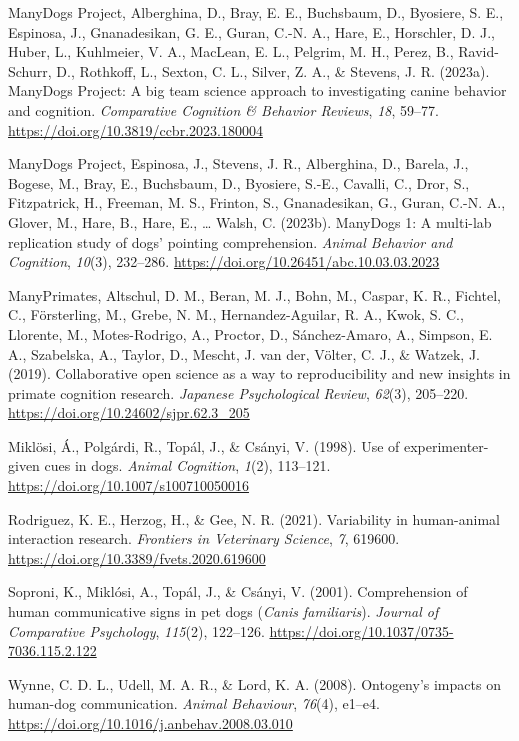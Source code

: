 \documentclass[
  man,floatsintext]{apa6}
\newlength{\cslhangindent}
\newlength{\cslentryspacingunit} %
\newenvironment{CSLReferences}[2] %
 {%
  \setlength{\parindent}{0pt}
  \ifodd #1
  \let\oldpar\par
  \def\par{\hangindent=\cslhangindent\oldpar}
  \fi
  \setlength{\parskip}{#2\cslentryspacingunit}
 }%
 {}
\begin{document}
\begin{CSLReferences}{1}{0}
\leavevmode{}%
ManyDogs Project, Alberghina, D., Bray, E. E., Buchsbaum, D., Byosiere, S. E., Espinosa, J., Gnanadesikan, G. E., Guran, C.-N. A., Hare, E., Horschler, D. J., Huber, L., Kuhlmeier, V. A., MacLean, E. L., Pelgrim, M. H., Perez, B., Ravid-Schurr, D., Rothkoff, L., Sexton, C. L., Silver, Z. A., \& Stevens, J. R. (2023a). {ManyDogs Project}: {A} big team science approach to investigating canine behavior and cognition. \emph{Comparative Cognition \& Behavior Reviews}, \emph{18}, 59--77. \url{https://doi.org/10.3819/ccbr.2023.180004}

\leavevmode{}%
ManyDogs Project, Espinosa, J., Stevens, J. R., Alberghina, D., Barela, J., Bogese, M., Bray, E., Buchsbaum, D., Byosiere, S.-E., Cavalli, C., Dror, S., Fitzpatrick, H., Freeman, M. S., Frinton, S., Gnanadesikan, G., Guran, C.-N. A., Glover, M., Hare, B., Hare, E., \ldots{} Walsh, C. (2023b). {ManyDogs} 1: {A} multi-lab replication study of dogs' pointing comprehension. \emph{Animal Behavior and Cognition}, \emph{10}(3), 232--286. \url{https://doi.org/10.26451/abc.10.03.03.2023}

\leavevmode{}%
ManyPrimates, Altschul, D. M., Beran, M. J., Bohn, M., Caspar, K. R., Fichtel, C., Försterling, M., Grebe, N. M., Hernandez-Aguilar, R. A., Kwok, S. C., Llorente, M., Motes-Rodrigo, A., Proctor, D., Sánchez-Amaro, A., Simpson, E. A., Szabelska, A., Taylor, D., Mescht, J. van der, Völter, C. J., \& Watzek, J. (2019). Collaborative open science as a way to reproducibility and new insights in primate cognition research. \emph{Japanese Psychological Review}, \emph{62}(3), 205--220. \url{https://doi.org/10.24602/sjpr.62.3_205}

\leavevmode{}%
Miklösi, Á., Polgárdi, R., Topál, J., \& Csányi, V. (1998). Use of experimenter-given cues in dogs. \emph{Animal Cognition}, \emph{1}(2), 113--121. \url{https://doi.org/10.1007/s100710050016}

\leavevmode{}%
Rodriguez, K. E., Herzog, H., \& Gee, N. R. (2021). Variability in human-animal interaction research. \emph{Frontiers in Veterinary Science}, \emph{7}, 619600. \url{https://doi.org/10.3389/fvets.2020.619600}

\leavevmode{}%
Soproni, K., Miklósi, A., Topál, J., \& Csányi, V. (2001). Comprehension of human communicative signs in pet dogs (\emph{{Canis} familiaris}). \emph{Journal of Comparative Psychology}, \emph{115}(2), 122--126. \url{https://doi.org/10.1037/0735-7036.115.2.122}

\leavevmode{}%
Wynne, C. D. L., Udell, M. A. R., \& Lord, K. A. (2008). Ontogeny's impacts on human-dog communication. \emph{Animal Behaviour}, \emph{76}(4), e1--e4. \url{https://doi.org/10.1016/j.anbehav.2008.03.010}

\end{CSLReferences}
\end{document}
